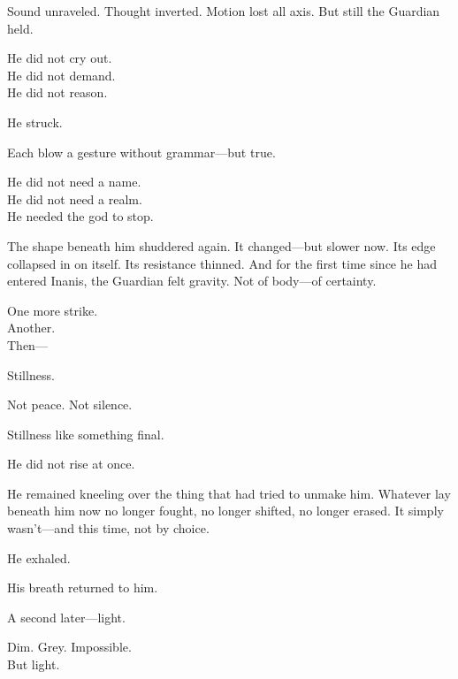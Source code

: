 \documentclass[12pt]{article}
\begin{document}
\vspace{0.5em}
Sound unraveled. Thought inverted. Motion lost all axis. But still the Guardian held.

\vspace{0.5em}
He did not cry out.\\
He did not demand.\\
He did not reason.

\vspace{0.5em}
He struck.

\vspace{0.5em}
Each blow a gesture without grammar---but true.

\vspace{0.5em}
He did not need a name.\\
He did not need a realm.\\
He needed the god to stop.

\vspace{0.5em}
The shape beneath him shuddered again. It changed---but slower now. Its edge collapsed in on itself. Its resistance thinned. And for the first time since he had entered Inanis, the Guardian felt gravity. Not of body---of certainty.

\vspace{0.5em}
One more strike.\\
Another.\\
Then---

\vspace{0.5em}
Stillness.

\vspace{0.5em}
Not peace. Not silence.

\vspace{0.5em}
Stillness like something final.

\vspace{0.5em}
He did not rise at once.

\vspace{0.5em}
He remained kneeling over the thing that had tried to unmake him. Whatever lay beneath him now no longer fought, no longer shifted, no longer erased. It simply wasn’t---and this time, not by choice.

\vspace{0.5em}
He exhaled.

\vspace{0.5em}
His breath returned to him.

\vspace{0.5em}
A second later---light.

\vspace{0.5em}
Dim. Grey. Impossible.\\
But light.
\end{document}
